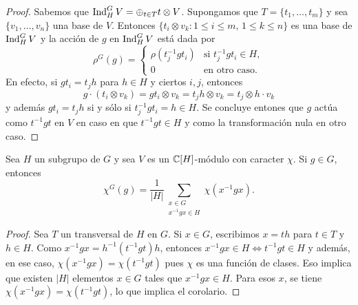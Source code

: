 \begin{proof}
    Sabemos que $\operatorname{Ind}_H^GV=\oplus_{t\in T}t\otimes V$. 
    Supongamos que $T=\{t_1,\dots,t_m\}$ 
    y sea $\{v_1,\dots,v_n\}$ una base de $V$. 
    Entonces $\{t_i\otimes v_k:1\leq i\leq m,\,1\leq k\leq n\}$ es 
    una base de $\operatorname{Ind}_H^GV$ y la acción
    de $g$ en $\operatorname{Ind}_H^GV$ está dada por
    \[
    \rho^G(g)=\begin{cases}
    \rho(t_j^{-1}gt_i) & \text{si $t_j^{-1}gt_i\in H$},\\
    0 & \text{en otro caso}.
    \end{cases}
    \]
    En efecto, si $gt_i=t_jh$ para $h\in H$ y ciertos $i,j$, entonces 
    \[
    g\cdot (t_i\otimes v_k)=gt_i\otimes v_k=t_jh\otimes v_k=t_j\otimes h\cdot v_k
    \]
    y además $gt_i=t_jh$ si y sólo si $t_j^{-1}gt_i=h\in H$. Se concluye entones
    que $g$ actúa como $t^{-1}gt$ en $V$ en caso en que $t^{-1}gt\in H$ y 
    como la transformación nula en otro caso. 
\end{proof}

\begin{corollary}
\label{cor:induccion}
    Sea $H$ un subgrupo de $G$ 
    y sea $V$ es un $\mathbb{C}[H]$-módulo con caracter $\chi$.
    Si $g\in G$, entonces
    \[
    \chi^G(g)=\frac{1}{|H|}\sum_{\substack{x\in G\\x^{-1}gx\in H}}\chi(x^{-1}gx).
    \]
\end{corollary}

\begin{proof}
    Sea $T$ un transversal de $H$ en $G$. Si $x\in G$, escribimos $x=th$ para $t\in T$ y $h\in H$. 
    Como $x^{-1}gx=h^{-1}(t^{-1}gt)h$, entonces $x^{-1}gx\in H\Longleftrightarrow t^{-1}gt\in H$ y además, en ese caso, 
    $\chi(x^{-1}gx)=\chi(t^{-1}gt)$ pues $\chi$ es una función de clases. Eso implica que existen $|H|$ elementos $x\in G$ 
    tales que $x^{-1}gx\in H$. Para esos $x$, se tiene $\chi(x^{-1}gx)=\chi(t^{-1}gt)$, lo que implica 
    el corolario. 
\end{proof}


